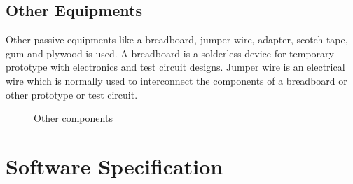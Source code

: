 \subsection{Other Equipments}
Other passive equipments like a breadboard, jumper wire, adapter, scotch tape, gum and plywood is used. A breadboard is a solderless device for temporary prototype with electronics and test circuit designs. Jumper wire is an electrical wire which is normally used to interconnect the components of a breadboard or other prototype or test circuit.
\begin{figure}[H]
\centering
{} 
\hspace{1cm}
\hspace{1cm}
\hspace{1cm}
\hspace{1cm}
\caption{Other components}
\label{Other1}
\end{figure}
\section{Software Specification}

